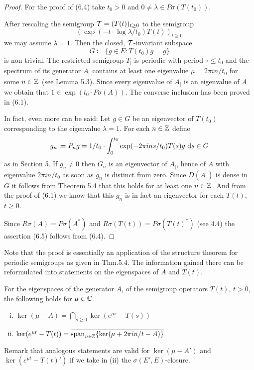 \begin{proof}
For the proof of (6.4) take $t_{0} > 0$ and $0 \neq \lambda \in P\sigma(T(t_{0}))$.

After rescaling the semigroup $\mathcal{T} = (T(t))_{t \geq 0}$ to the semigroup
\[
(\exp(-t \cdot \log\lambda/t_{0})T(t))_{t \geq 0}
\]
we may assume $\lambda = 1$. 
Then the closed, $\mathcal{T}$-invariant subspace
\[
G \coloneqq \{g \in E \colon T(t_{0})g = g\}
\]
is non trivial.
The restricted semigroup $T_{|}$ is periodic with period $\tau \leq t_{0}$ and the spectrum of its generator $A_{|}$ contains at least one eigenvalue $\mu = 2\pi in/t_{0}$ for some $n \in \mathbb{Z}$ (see Lemma 5.3).
Since every eigenvalue of $A_{|}$ is an eigenvalue of $A$ we obtain that $1 \in \exp(t_{0} \cdot P\sigma(A))$.
The converse inclusion has been proved in (6.1).

In fact, even more can be said: Let $g \in G$ be an eigenvector of $T(t_{0})$ corresponding to the eigenvalue $\lambda = 1$.
For each $n \in \mathbb{Z}$ define
\[
g_{n} \coloneqq P_{n}g = 1/t_{0} \cdot \int_{0}^{t_{0}} \exp(-2\pi ins/t_{0})T(s)g \, \mathop{}\!\mathrm{d}{s} \in G
\]
as in Section 5.
If $g_{n} \ne 0$ then $G_n$ is an eigenvector of $A_{|}$, hence of $A$ with eigenvalue $2\pi in/t_{0}$ as soon as $g_{n}$ is distinct from zero.
Since $D(A_{|})$ is dense in $G$ it follows from Theorem 5.4 that this holds for at least one $n \in \mathbb{Z}$.
And from the proof of (6.1) we know that this $g_{n}$ is in fact an eigenvector for each $T(t)$, $t \geq 0$.

Since $R\sigma(A) = P\sigma(A^*)$ and $R\sigma(T(t)) = P\sigma(T(t)^*)$ (see 4.4) the assertion (6.5) follows from (6.4).
\end{proof}
Note that the proof is essentially an application of the structure theorem for periodic semigroups as given in Thm.5.4.
The information gained there can be reformulated into statements on the eigenspaces of $A$ and $T(t)$.
\begin{corollary}\label{cor:a3-6.4}
For the eigenspaces of the generator $A$, \resp of the semigroup operators $T(t)$, $t > 0$, the following holds  for  $\mu \in \mathbb{C}$.
\begin{enumerate}[(i)]
\item 
$\ker(\mu - A) = \bigcap_{s \geq 0} \ker(e^{\mu s} - T(s))$

\item 
$\ker(e^{\mu t} - T(t)) = \overline{\mathrm{span}_{n \in \mathbb{Z}} \{\ker(\mu + 2\pi i n/t - A)\}}$

\end{enumerate}
\end{corollary}
Remark that analogous statements are valid for $\ker(\mu - A')$ and $\ker(e^{\mu t} - T(t)')$ if we take in (ii) the $\sigma(E',E)$-closure.

